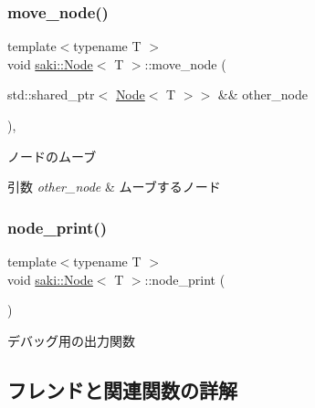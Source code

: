 \subsubsection{\texorpdfstring{move\+\_\+node()}{move\_node()}}
{\footnotesize\ttfamily template$<$typename T $>$ \\
void \mbox{\hyperlink{classsaki_1_1_node}{saki\+::\+Node}}$<$ T $>$\+::move\+\_\+node (\begin{DoxyParamCaption}\item[{std\+::shared\+\_\+ptr$<$ \mbox{\hyperlink{classsaki_1_1_node}{Node}}$<$ T $>$$>$ \&\&}]{other\+\_\+node }\end{DoxyParamCaption})\hspace{0.3cm}{\ttfamily [inline]}, {\ttfamily [noexcept]}}



ノードのムーブ 


\begin{DoxyParams}{引数}
{\em other\+\_\+node} & ムーブするノード \\
\hline
\end{DoxyParams}
\mbox{\label{classsaki_1_1_node_ac5b08cdb3fd3c60e38d849b7d18a9782}} 
\subsubsection{\texorpdfstring{node\+\_\+print()}{node\_print()}}
{\footnotesize\ttfamily template$<$typename T $>$ \\
void \mbox{\hyperlink{classsaki_1_1_node}{saki\+::\+Node}}$<$ T $>$\+::node\+\_\+print (\begin{DoxyParamCaption}{ }\end{DoxyParamCaption})\hspace{0.3cm}{\ttfamily [inline]}}



デバッグ用の出力関数 



\subsection{フレンドと関連関数の詳解}
\mbox{\label{classsaki_1_1_node_a151ca71f2c751d8a163f3f99ccf6cec9}} 
